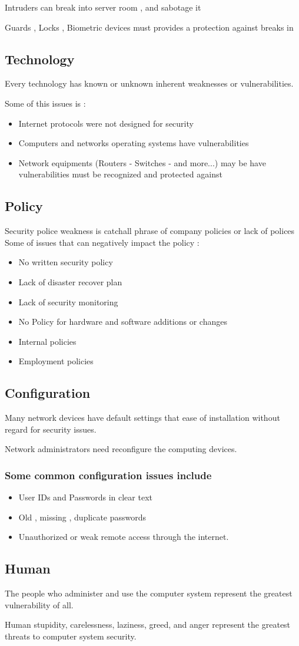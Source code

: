\documentclass{article}
\begin{document}
Intruders can break into server room , and sabotage it

Guards , Locks , Biometric devices must provides a protection against breaks in

\subsection{Technology}
Every technology has known or unknown inherent weaknesses or vulnerabilities.

Some of this issues is :
\begin{itemize}
    \item Internet protocols were not designed for security
    \item Computers and networks operating systems have vulnerabilities
    \item Network equipments (Routers - Switches - and more...) may be have vulnerabilities must be recognized and protected against
\end{itemize}
\subsection{Policy}
Security police weakness is catchall phrase of company policies or lack of polices
Some of issues that can negatively impact the policy :
\begin{itemize}
    \item No written security policy
    \item Lack of disaster recover plan
    \item Lack of security monitoring
    \item No Policy for hardware and software additions or changes
    \item Internal policies
    \item Employment policies
\end{itemize}
\subsection{Configuration}
Many network devices have default settings that ease of installation without regard for security issues.

Network administrators need reconfigure the computing devices.

\subsubsection{Some common configuration issues include}
\begin{itemize}
    \item User IDs and Passwords in clear text
    \item Old , missing , duplicate passwords
    \item Unauthorized or weak remote access through the internet.
\end{itemize}
\subsection{Human}
The people who administer and use the computer system represent the greatest vulnerability of all. 

Human stupidity, carelessness, laziness, greed, and anger represent the greatest threats to computer system security.
\end{document}
